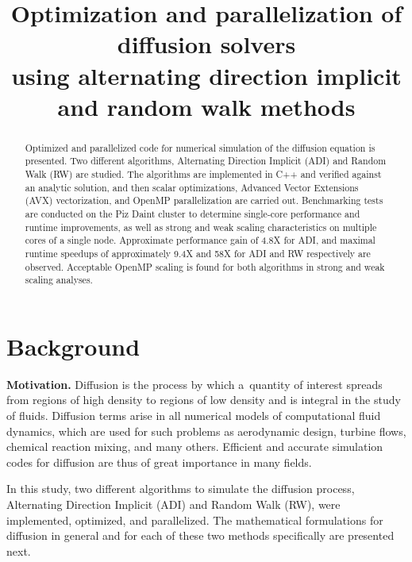 \documentclass[letterpaper]{article}
\title{Optimization and parallelization of diffusion solvers\\
using alternating direction implicit and random walk methods}
\newcommand{\mypar}[1]{{\bf #1.}}
\begin{document}
%
\maketitle
%


\begin{abstract}
Optimized and parallelized code for numerical simulation of the diffusion equation is presented. Two different algorithms, Alternating Direction Implicit (ADI) and Random Walk (RW) are studied. The algorithms are implemented in C++ and verified against an analytic solution, and then scalar optimizations, Advanced Vector Extensions (AVX) vectorization, and OpenMP parallelization are carried out. Benchmarking tests are conducted on the Piz Daint cluster to determine single-core performance and runtime improvements, as well as strong and weak scaling characteristics on multiple cores of a single node. Approximate performance gain of 4.8X for ADI, and maximal runtime speedups of approximately 9.4X and 58X for ADI and RW respectively are observed. Acceptable OpenMP scaling is found for both algorithms in strong and weak scaling analyses.
\end{abstract}


\section{Background}\label{sec:background}

\mypar{Motivation} 
Diffusion is the process by which a~quantity of interest spreads from regions of high density to regions of low density and is integral in the study of fluids. Diffusion terms arise in all numerical models of computational fluid dynamics, which are used for such problems as aerodynamic design, turbine flows, chemical reaction mixing, and many others. Efficient and accurate simulation codes for diffusion are thus of great importance in many fields.

In this study, two different algorithms to simulate the diffusion process, Alternating Direction Implicit (ADI) and Random Walk (RW), were implemented, optimized, and parallelized. The mathematical formulations for diffusion in general and for each of these two methods specifically are presented next.
\end{document}

